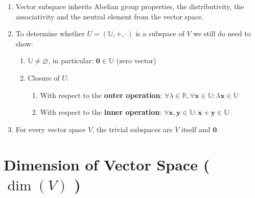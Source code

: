 \begin{enumerate}[itemsep=0.2cm]
    \item Vector subspace inherits Abelian group properties, the distributivity, the associativity and the neutral element from the vector space.

    \item To determine whether $U = (\mathbb{U}, +, \cdot)$ is a subspace of $V$ we still do need to show:
    \begin{enumerate}
        \item $\mathbb{U} \neq \varnothing$, in particular: $\mathbf{0} \in \mathbb{U}$ (zero vector)
        \item Closure of $U$:
        \begin{enumerate}
            \item With respect to the \textbf{outer operation}: $\forall\lambda \in \mathbb{R}, \forall\mathbf{x} \in \mathbb{U} : \lambda \mathbf{x} \in \mathbb{U}$
            \item With respect to the \textbf{inner operation}: $\forall\mathbf{x, y} \in \mathbb{U} : \mathbf{x + y} \in \mathbb{U}$
        \end{enumerate}
    \end{enumerate}

    \item For every vector space $V$, the trivial subspaces are $V$ itself and ${\mathbf{0}}$.
    
\end{enumerate}








\section{Dimension of Vector Space ( $\dim(V)$ ) \cite{mfml-1}}\label{lin-alg: Dimension-vector-space}

